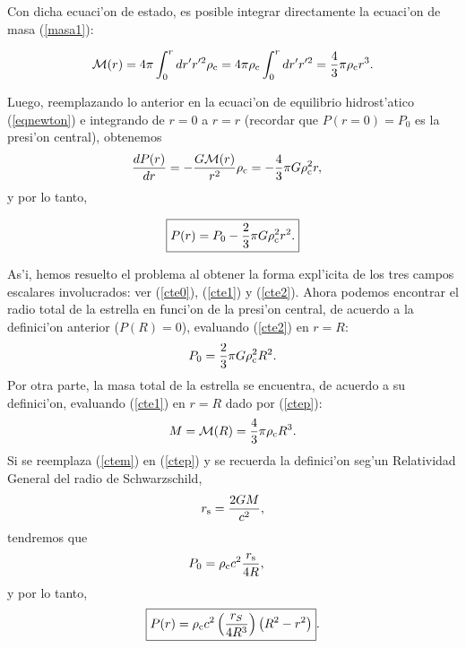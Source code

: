 Con dicha ecuaci'on de estado, es posible integrar directamente la ecuaci'on de masa (\ref{masa1}):

\begin{equation}\label{cte1}
\mathcal{M}(r)=4\pi\int^r_{0}dr'r'^2\rho_{\rm c}=4\pi\rho_{\rm c}\int^r_{0}dr'r'^2=\frac{4}{3}\pi\rho_{\rm c} r^3.
\end{equation}

Luego, reemplazando lo anterior en la ecuaci'on de equilibrio hidrost'atico (\ref{eqnewton}) e integrando de $r=0$ a $r=r$ (recordar que $P(r=0)=P_0$ es la presi'on central), obtenemos
\begin{align*}
 \frac{dP(r)}{dr}&=-\frac{G\mathcal{M}(r)}{r^2}\rho_{\rm c}=-\frac{4}{3}\pi G\rho_{\rm c}^2 r,
\end{align*}
y por lo tanto,

\begin{equation}
\label{cte2}\boxed{P(r)=P_0-\frac{2}{3}\pi G\rho_{\rm c}^2 r^2.}
\end{equation}

As'i, hemos resuelto el problema al obtener la forma expl'icita de los tres campos escalares involucrados: ver (\ref{cte0}), (\ref{cte1}) y (\ref{cte2}). Ahora podemos encontrar el radio total de la estrella en funci'on de la presi'on central, de acuerdo a la definici'on anterior ($P(R)=0$), evaluando (\ref{cte2}) en $r=R$:
\begin{equation}\label{ctep}
 P_0=\frac{2}{3}\pi G\rho_{\rm c}^2 R^2.
\end{equation}
Por otra parte, la masa total de la estrella se encuentra, de acuerdo a su definici'on, evaluando (\ref{cte1}) en $r=R$ dado por (\ref{ctep}):
\begin{equation}\label{ctem}
 M=\mathcal{M}(R)=\frac{4}{3}\pi\rho_{\rm c} R^3.
\end{equation}
Si se reemplaza (\ref{ctem}) en (\ref{ctep}) y se recuerda la definici'on seg'un Relatividad General del radio de Schwarzschild,
\begin{equation}\label{radiosch}
 r_{\rm s}=\frac{2GM}{c^2},
\end{equation}
tendremos que
\begin{align*}
P_0 &=\rho_{\rm c} c^2\frac{r_{\rm s}}{4R},
\end{align*}
y por lo tanto,
\begin{equation}\label{presionnewton}
 \boxed{P(r)=\rho_{\rm c} c^2\left(\frac{r_S}{4 R^3}\right)\left(R^2-r^2\right)}.
\end{equation}


